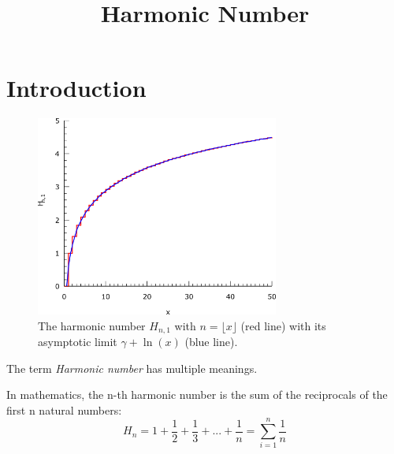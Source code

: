 \documentclass[2pt]{article}
\title{Harmonic Number}
\begin{document}
\date{\vspace{-5ex}}
\maketitle 
\section{Introduction}
\begin{figure}
\includegraphics[width=8cm]{1.png}\caption{\small{The harmonic number $H_{n,1}$ with $n=\lfloor{x}\rfloor$ (red line) with its asymptotic limit $\gamma+\ln(x)$ (blue line).}}\end{figure}
\begin{flushleft}
The term \emph{Harmonic number} has multiple meanings.
\end{flushleft}
In mathematics, the n-th harmonic number is the sum of the reciprocals of the first n natural numbers:
\begin{equation}
H_{n}=1+\frac{1}{2}+\frac{1}{3}+...+\frac{1}{n}=\sum_{i=1}^n \frac{1}{n} \label{nth harmonic number}\nonumber
\end{equation}
\end{document}
